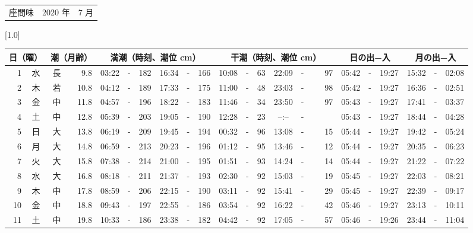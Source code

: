 \documentclass[12pt,a4j]{jsarticle}
\begin{document}
 \begin{table}[htbp]
 \begin{center}
 \begin{tabular}{lcc}
 \LARGE{座間味}  & \large{2020 年} & \large{ 7 月} \\
 \end{tabular}
 \end{center}
 \begin{center}
    \scalebox{0.7}[1.0]{
    \begin{tabular}{|rc|cr|ccrccr|ccrccr|ccc|ccc|}
    \hline
    \multicolumn{2}{|c|}{日（曜）} & \multicolumn{2}{c|}{潮（月齢）} & \multicolumn{6}{c|}{満潮（時刻、潮位 cm）} & \multicolumn{6}{c|}{干潮（時刻、潮位 cm）} & \multicolumn{3}{c|}{日の出−入} &  \multicolumn{3}{c|}{月の出−入}\\
 \hline
 1 & 水 & 長 &  9.8 &  03:22 &-& 182 &  16:34 &-& 166 &  10:08 &-&  63 &  22:09 &-&  97 & 05:42 & -& 19:27 & 15:32 & -& 02:08 \\
 2 & 木 & 若 & 10.8 &  04:12 &-& 189 &  17:33 &-& 175 &  11:00 &-&  48 &  23:03 &-&  98 & 05:42 & -& 19:27 & 16:36 & -& 02:51 \\
 3 & 金 & 中 & 11.8 &  04:57 &-& 196 &  18:22 &-& 183 &  11:46 &-&  34 &  23:50 &-&  97 & 05:43 & -& 19:27 & 17:41 & -& 03:37 \\
 4 & 土 & 中 & 12.8 &  05:39 &-& 203 &  19:05 &-& 190 &  12:28 &-&  23 &  --:-- &-&~~~~~ & 05:43 & -& 19:27 & 18:44 & -& 04:28 \\
 5 & 日 & 大 & 13.8 &  06:19 &-& 209 &  19:45 &-& 194 &  00:32 &-&  96 &  13:08 &-&  15 & 05:44 & -& 19:27 & 19:42 & -& 05:24 \\
 6 & 月 & 大 & 14.8 &  06:59 &-& 213 &  20:23 &-& 196 &  01:12 &-&  95 &  13:46 &-&  12 & 05:44 & -& 19:27 & 20:35 & -& 06:23 \\
 7 & 火 & 大 & 15.8 &  07:38 &-& 214 &  21:00 &-& 195 &  01:51 &-&  93 &  14:24 &-&  14 & 05:44 & -& 19:27 & 21:22 & -& 07:22 \\
 8 & 水 & 大 & 16.8 &  08:18 &-& 211 &  21:37 &-& 193 &  02:30 &-&  92 &  15:03 &-&  19 & 05:45 & -& 19:27 & 22:03 & -& 08:21 \\
 9 & 木 & 中 & 17.8 &  08:59 &-& 206 &  22:15 &-& 190 &  03:11 &-&  92 &  15:41 &-&  29 & 05:45 & -& 19:27 & 22:39 & -& 09:17 \\
10 & 金 & 中 & 18.8 &  09:43 &-& 197 &  22:55 &-& 186 &  03:54 &-&  92 &  16:22 &-&  42 & 05:46 & -& 19:27 & 23:13 & -& 10:11 \\
11 & 土 & 中 & 19.8 &  10:33 &-& 186 &  23:38 &-& 182 &  04:42 &-&  92 &  17:05 &-&  57 & 05:46 & -& 19:26 & 23:44 & -& 11:04 \\

\end{tabular}}
\end{center}
\end{table}
\end{document}

